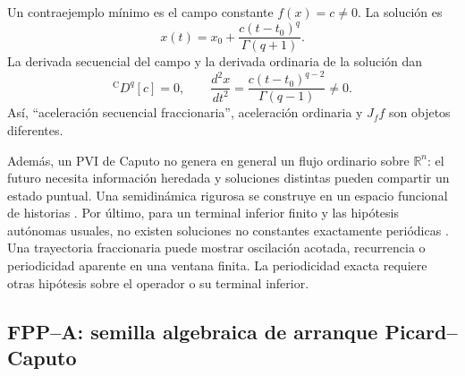 Un contraejemplo mínimo es el campo constante \(f(x)=c\neq0\). La solución es
\begin{equation}
 x(t)=x_0+\frac{c(t-t_0)^q}{\Gamma(q+1)}.
 \label{eq:pp-constant-field-solution}
\end{equation}
La derivada secuencial del campo y la derivada ordinaria de la solución dan
\begin{equation}
 {}^{\mathrm C}D^q[c]=0,
 \qquad
 \frac{d^2x}{dt^2}
 =\frac{c(t-t_0)^{q-2}}{\Gamma(q-1)}\neq0.
 \label{eq:pp-constant-field-counterexample}
\end{equation}
Así, ``aceleración secuencial fraccionaria'', aceleración ordinaria y
\(J_f f\) son objetos diferentes.

Además, un PVI de Caputo no genera en general un flujo ordinario sobre
\(\mathbb R^n\): el futuro necesita información heredada y soluciones
distintas pueden compartir un estado puntual. Una semidinámica rigurosa se
construye en un espacio funcional de historias
\cite{CongTuan2017Nonlocal,DoanKloeden2021Semidynamical}. Por último, para un
terminal inferior finito y las hipótesis autónomas usuales, no existen
soluciones no constantes exactamente periódicas
\cite{TavazoeiHaeri2009,KaslikSivasundaram2012}. Una trayectoria fraccionaria puede mostrar oscilación acotada, recurrencia o
periodicidad aparente en una ventana finita. La periodicidad exacta requiere
otras hipótesis sobre el operador o su terminal inferior.

\subsection{FPP--A: semilla algebraica de arranque Picard--Caputo}

